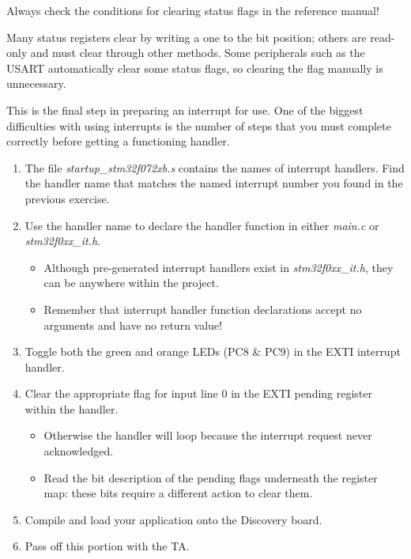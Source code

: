 \documentclass[openany,11pt,fleqn]{book} %
\begin{document}
\begin{warning}
    Always check the conditions for clearing status flags in the reference manual!
    
    Many status registers clear by writing a one to the bit position; others are read-only and must clear through other methods. Some peripherals such as the USART automatically clear some status flags, so clearing the flag manually is unnecessary.
\end{warning}

\begin{assignment}
    \label{ex5}
    This is the final step in preparing an interrupt for use. One of the biggest difficulties with using interrupts is the number of steps that you must complete correctly before getting a functioning handler.
    
    \begin{enumerate}
        \item The file \textit{startup\_stm32f072xb.s} contains the names of interrupt handlers. Find the handler name that matches the named interrupt number you found in the previous exercise. 
        \item Use the handler name to declare the handler function in either \textit{main.c} or \textit{stm32f0xx\_it.h}.
        \begin{itemize}
            \item Although pre-generated interrupt handlers exist in \textit{stm32f0xx\_it.h}, they can be anywhere within the project. 
            \item Remember that interrupt handler function declarations accept no arguments and have no return value! 
        \end{itemize}
        \item Toggle both the green and orange LEDs (PC8 \& PC9) in the EXTI interrupt handler. 
        \item Clear the appropriate flag for input line 0 in the EXTI pending register within the handler.
        \begin{itemize}
            \item Otherwise the handler will loop because the interrupt request never acknowledged.
            \item Read the bit description of the pending flags underneath the register map: these bits require a different action to clear them.
        \end{itemize}
        \item Compile and load your application onto the Discovery board.
        \item Pass off this portion with the TA.
    \end{enumerate}
    

\end{assignment}
\end{document}
